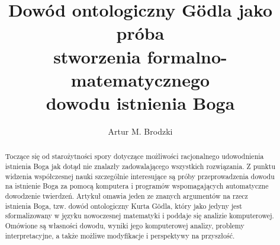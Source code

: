 \documentclass[runningheads]{llncs}
\begin{document}
\title{
	Dowód ontologiczny G\"odla jako próba \\ 
	stworzenia formalno-matematycznego \\ 
	dowodu istnienia Boga
}

\author{
	Artur M. Brodzki \\ 
}

%
\maketitle

\begin{abstract}
Toczące się od starożytności spory dotyczące możliwości racjonalnego udowodnienia istnienia Boga jak dotąd nie znalazły zadowalającego wszystkich rozwiązania. Z punktu widzenia współczesnej nauki szczególnie interesujące są próby przeprowadzenia dowodu na istnienie Boga za pomocą komputera i programów wspomagających automatyczne dowodzenie twierdzeń. Artykuł omawia jeden ze znanych argumentów na rzecz istnienia Boga, tzw. dowód ontologiczny Kurta G\"odla, który jako jedyny jest sformalizowany w języku nowoczesnej matematyki i poddaje się analizie komputerowej. Omówione są własności dowodu, wyniki jego komputerowej analizy, problemy interpretacyjne, a także możliwe modyfikacje i perspektywy na przyszłość. 

\end{abstract}
\end{document}
